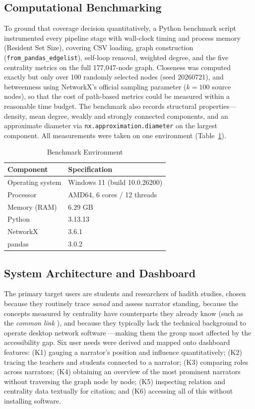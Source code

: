 \documentclass[conference]{IEEEtran}
\begin{document}
\subsection{Computational Benchmarking}
\label{sec:m-bench}

To ground that coverage decision quantitatively, a Python benchmark script
instrumented every pipeline stage with wall-clock timing and process memory
(Resident Set Size), covering CSV loading, graph construction
(\texttt{from\_pandas\_edgelist}), self-loop removal, weighted degree, and the
five centrality metrics on the full 177{,}047-node graph. Closeness was computed
exactly but only over 100 randomly selected nodes (seed 20260721), and betweenness
using NetworkX's official sampling parameter ($k=100$ source nodes), so that the
cost of path-based metrics could be measured within a reasonable time budget. The
benchmark also records structural properties---density, mean degree, weakly and
strongly connected components, and an approximate diameter via
\texttt{nx.approximation.diameter} on the largest component. All measurements were
taken on one environment (Table~\ref{tab:env}).

\begin{table}[!t]
\caption{Benchmark Environment}
\label{tab:env}
\centering
\renewcommand{\arraystretch}{1.3}
\begin{tabular}{ll}
\toprule
Component & Specification \\
\midrule
Operating system & Windows 11 (build 10.0.26200) \\
Processor        & AMD64, 6 cores / 12 threads \\
Memory (RAM)     & 6.29 GB \\
Python           & 3.13.13 \\
NetworkX         & 3.6.1 \\
pandas           & 3.0.2 \\
\bottomrule
\end{tabular}
\end{table}

\subsection{System Architecture and Dashboard}

The primary target users are students and researchers of hadith studies, chosen
because they routinely trace \textit{sanad} and assess narrator standing, because
the concepts measured by centrality have counterparts they already know (such as
the \textit{common link} \cite{mufid2023track}), and because they typically lack
the technical background to operate desktop network software
\cite{FAROOQI2024110439}---making them the group most affected by the
accessibility gap. Six user needs were derived and mapped onto dashboard features:
(K1) gauging a narrator's position and influence quantitatively; (K2) tracing the
teachers and students connected to a narrator; (K3) comparing roles across
narrators; (K4) obtaining an overview of the most prominent narrators without
traversing the graph node by node; (K5) inspecting relation and centrality data
textually for citation; and (K6) accessing all of this without installing
software.
\end{document}
